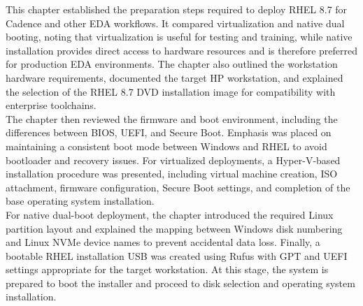 \begin{tcolorbox}
\noindent This chapter established the preparation steps required to deploy RHEL 8.7 for Cadence and other EDA workflows. It compared virtualization and native dual booting, noting that virtualization is useful for testing and training, while native installation provides direct access to hardware resources and is therefore preferred for production EDA environments. The chapter also outlined the workstation hardware requirements, documented the target HP workstation, and explained the selection of the RHEL 8.7 DVD installation image for compatibility with enterprise toolchains. \\

\noindent The chapter then reviewed the firmware and boot environment, including the differences between BIOS, UEFI, and Secure Boot. Emphasis was placed on maintaining a consistent boot mode between Windows and RHEL to avoid bootloader and recovery issues. For virtualized deployments, a Hyper-V-based installation procedure was presented, including virtual machine creation, ISO attachment, firmware configuration, Secure Boot settings, and completion of the base operating system installation. \\

\noindent For native dual-boot deployment, the chapter introduced the required Linux partition layout and explained the mapping between Windows disk numbering and Linux NVMe device names to prevent accidental data loss. Finally, a bootable RHEL installation USB was created using Rufus with GPT and UEFI settings appropriate for the target workstation. At this stage, the system is prepared to boot the installer and proceed to disk selection and operating system installation.
\end{tcolorbox}
